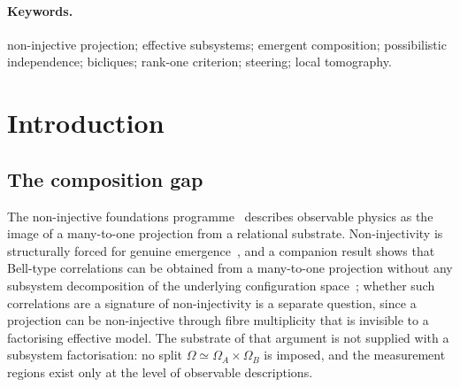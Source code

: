 \documentclass[11pt,a4paper]{article}
\newcommand{\Om}{\Omega}
\begin{document}
\begin{abstract}
    assembly into a proposed finite prerequisite contract of support and preparation criteria for emergent
    effective subsystems over an admissibility structure without a supplied subsystem factorisation.
    The hypotheses abstract the composition problem motivated by the non-injective foundations programme,
    but their realisation from the programme's axioms is not derived here, and the physical necessity of
    the contract itself is not derived from an operational theory.
    \emph{Interpretive reading (structural, not a result):} the absence of a supplied subsystem
    factorisation does not forbid independent effective subsystems; it relocates their independence from an
    inherited property of the substrate to an emergent property of the projected support and of the
    preparation weights.
  \end{abstract}

  \paragraph{Keywords.}
    non-injective projection; effective subsystems; emergent composition; possibilistic independence;
    bicliques; rank-one criterion; steering; local tomography.

    \clearpage
    \tableofcontents

    \clearpage
  \section{Introduction}
  \label{sec:intro}

  \subsection{The composition gap}
    \label{ssec:gap}

    The non-injective foundations programme~\cite{Beau2026m} describes observable physics as
    the image of a many-to-one projection from a relational substrate.
    Non-injectivity is structurally forced for genuine emergence~\cite{Beau2026l}, and a companion result
    shows that Bell-type correlations can be obtained from a many-to-one projection without any subsystem
    decomposition of the underlying configuration space~\cite{Beau2026b}; whether such correlations are a
    signature of non-injectivity is a separate question, since a projection can be non-injective through
    fibre multiplicity that is invisible to a factorising effective model.
    The substrate of that argument is not supplied with a subsystem factorisation: no split
    $\Om \simeq \Om_A \times \Om_B$ is imposed, and the measurement regions exist only at the level of
    observable descriptions.
\end{document}
